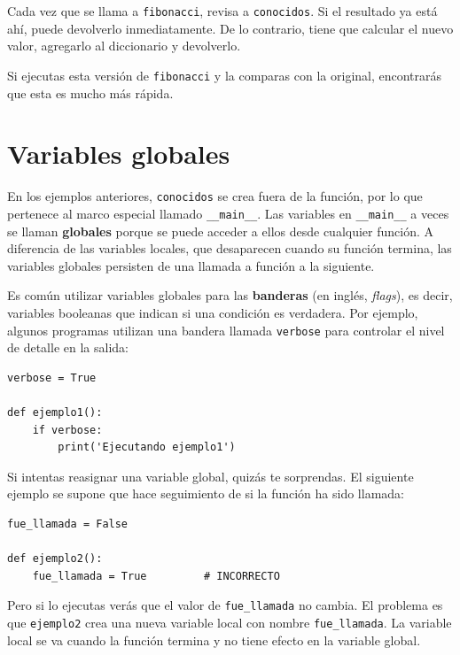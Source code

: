\documentclass[10pt]{book}
\begin{document}
Cada vez que se llama a {\tt fibonacci}, revisa a {\tt conocidos}.
Si el resultado ya está ahí, puede devolverlo
inmediatamente.  De lo contrario, tiene que
calcular el nuevo valor, agregarlo al diccionario y devolverlo.

Si ejecutas esta versión de {\tt fibonacci} y la comparas con
la original, encontrarás que esta es mucho más rápida.



\section{Variables globales}

En los ejemplos anteriores, {\tt conocidos} se crea fuera de la función,
por lo que pertenece al marco especial llamado \verb"__main__".
Las variables en \verb"__main__" a veces se llaman {\bf globales}
porque se puede acceder a ellos desde cualquier función.  A diferencia de las variables
locales, que desaparecen cuando su función termina, las variables globales 
persisten de una llamada a función a la siguiente.

Es común utilizar variables globales para las {\bf banderas} (en inglés, {\em flags}), es decir,
variables booleanas que indican si una condición
es verdadera.  Por ejemplo, algunos programas utilizan
una bandera llamada {\tt verbose} para controlar el nivel de detalle en la
salida:

\begin{verbatim}
verbose = True

def ejemplo1():
    if verbose:
        print('Ejecutando ejemplo1')
\end{verbatim}
%
Si intentas reasignar una variable global, quizás te sorprendas.
El siguiente ejemplo se supone que hace seguimiento de si la
función ha sido llamada:

\begin{verbatim}
fue_llamada = False

def ejemplo2():
    fue_llamada = True         # INCORRECTO 
\end{verbatim} 
% 
Pero si lo ejecutas verás que el valor de \verb"fue_llamada"
no cambia. El problema es que {\tt ejemplo2} crea una nueva variable local
con nombre \verb"fue_llamada".  La variable local se va cuando 
la función termina y no tiene efecto en la variable global.
\end{document}
